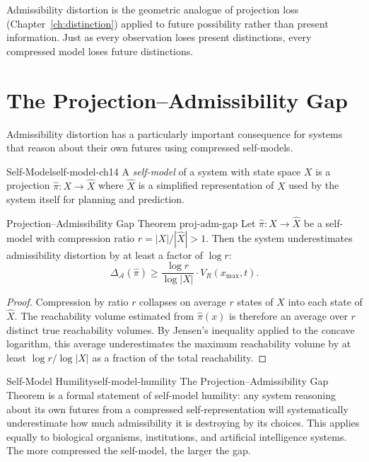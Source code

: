 \documentclass[12pt,twoside,openright]{book}
\newcommand{\adm}{\mathcal{A}}
\begin{document}
Admissibility distortion is the geometric analogue of
projection loss (Chapter~\ref{ch:distinction}) applied to
future possibility rather than present information. Just
as every observation loses present distinctions, every
compressed model loses future distinctions.

\section{The Projection--Admissibility Gap}
\label{sec:ch14-gap}

Admissibility distortion has a particularly important
consequence for systems that reason about their own futures
using compressed self-models.

\begin{definition}{Self-Model}{self-model-ch14}
  A \emph{self-model} of a system with state space $X$ is a
  projection $\hat\pi:X\to\hat{X}$ where $\hat{X}$ is a
  simplified representation of $X$ used by the system
  itself for planning and prediction.
\end{definition}

\begin{theorem}{Projection--Admissibility Gap Theorem}%
  {proj-adm-gap}
  Let $\hat\pi:X\to\hat{X}$ be a self-model with compression
  ratio $r = |X|/|\hat{X}| > 1$. Then the system
  underestimates admissibility distortion by at least a
  factor of $\log r$:
  \[
    \Delta_\adm(\hat\pi)
    \ge \frac{\log r}{\log|X|}\cdot V_R(x_\mathrm{max},t).
  \]
\end{theorem}

\begin{proof}
  Compression by ratio $r$ collapses on average $r$ states
  of $X$ into each state of $\hat{X}$. The reachability
  volume estimated from $\hat\pi(x)$ is therefore an
  average over $r$ distinct true reachability volumes. By
  Jensen's inequality applied to the concave logarithm,
  this average underestimates the maximum reachability
  volume by at least $\log r/\log|X|$ as a fraction of the
  total reachability.
\end{proof}

\begin{remark}{Self-Model Humility}{self-model-humility}
  The Projection--Admissibility Gap Theorem is a formal
  statement of self-model humility: any system reasoning
  about its own futures from a compressed self-representation
  will systematically underestimate how much admissibility
  it is destroying by its choices. This applies equally to
  biological organisms, institutions, and artificial
  intelligence systems. The more compressed the self-model,
  the larger the gap.
\end{remark}
\end{document}
